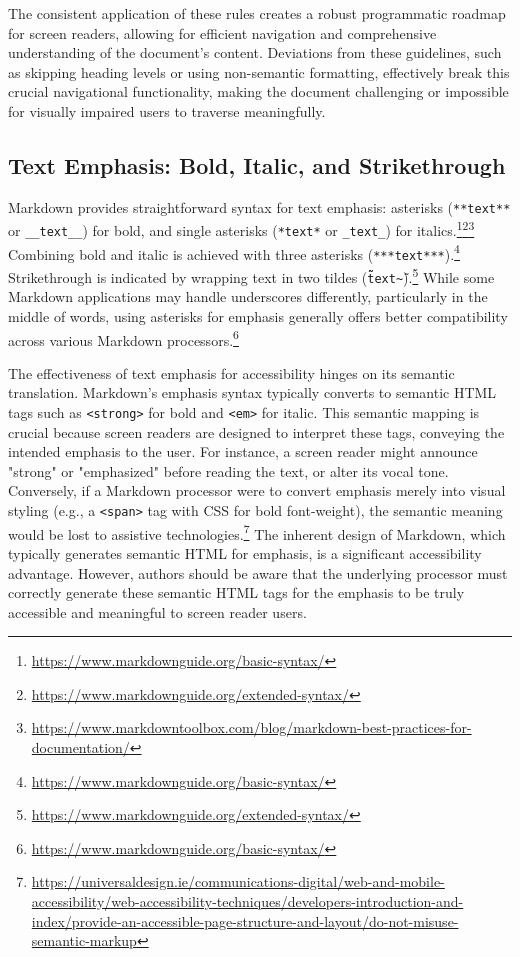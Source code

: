 The consistent application of these rules creates a robust programmatic roadmap for screen readers, allowing for efficient navigation and comprehensive understanding of the document's content. Deviations from these guidelines, such as skipping heading levels or using non-semantic formatting, effectively break this crucial navigational functionality, making the document challenging or impossible for visually impaired users to traverse meaningfully.

\subsection{Text Emphasis: Bold, Italic, and Strikethrough}
Markdown provides straightforward syntax for text emphasis: asterisks (\texttt{**text**} or \texttt{\_\_text\_\_}) for bold, and single asterisks (\texttt{*text*} or \texttt{\_text\_}) for italics.\footnote{\url{https://www.markdownguide.org/basic-syntax/}}\footnote{\url{https://www.markdownguide.org/extended-syntax/}}\footnote{\url{https://www.markdowntoolbox.com/blog/markdown-best-practices-for-documentation/}} Combining bold and italic is achieved with three asterisks (\texttt{***text***}).\footnote{\url{https://www.markdownguide.org/basic-syntax/}} Strikethrough is indicated by wrapping text in two tildes (\texttt{\~\~text\~\~}).\footnote{\url{https://www.markdownguide.org/extended-syntax/}} While some Markdown applications may handle underscores differently, particularly in the middle of words, using asterisks for emphasis generally offers better compatibility across various Markdown processors.\footnote{\url{https://www.markdownguide.org/basic-syntax/}}

The effectiveness of text emphasis for accessibility hinges on its semantic translation. Markdown's emphasis syntax typically converts to semantic HTML tags such as \texttt{<strong>} for bold and \texttt{<em>} for italic. This semantic mapping is crucial because screen readers are designed to interpret these tags, conveying the intended emphasis to the user. For instance, a screen reader might announce "strong" or "emphasized" before reading the text, or alter its vocal tone. Conversely, if a Markdown processor were to convert emphasis merely into visual styling (e.g., a \texttt{<span>} tag with CSS for bold font-weight), the semantic meaning would be lost to assistive technologies.\footnote{\url{https://universaldesign.ie/communications-digital/web-and-mobile-accessibility/web-accessibility-techniques/developers-introduction-and-index/provide-an-accessible-page-structure-and-layout/do-not-misuse-semantic-markup}} The inherent design of Markdown, which typically generates semantic HTML for emphasis, is a significant accessibility advantage. However, authors should be aware that the underlying processor must correctly generate these semantic HTML tags for the emphasis to be truly accessible and meaningful to screen reader users.

